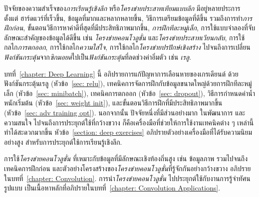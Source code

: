 ปัจจัยของความสำเร็จของ\textit{การเรียนรู้เชิงลึก}
หรือ\textit{โครงข่ายประสาทเทียมแบบลึก}
มีอยู่หลายประการ
ตั้งแต่ ฮาร์ดแวร์ที่เร็วขึ้น,
ข้อมูลที่มากและหลากหลายขึ้น, 
วิธีการเตรียมข้อมูลที่ดีขึ้น รวมถึงการทำ\textit{การฝึกก่อน}\cite{ErhanEtAl2010},
ขั้นตอนวิธีการหาค่าดีที่สุดที่มีประสิทธิภาพมากขึ้น\cite{IoffeSzegedy2015a, KingmaBa2015}, 
\textit{การฝึกทีละหมู่เล็ก}\cite{Bengio2012a},
การใช้แบบจำลองที่จับลักษณะสำคัญของข้อมูลได้ดีขึ้น เช่น \textit{โครงข่ายคอนโวลูชั่น}\cite{LeCunEtAl2015a} และ\textit{โครงข่ายประสาทเวียนกลับ}\cite{HochreiterEtAl2001a, HochreiterSchmidhuber1997, SchusterPaliwal1997},
การใช้กลไก\textit{การตกออก}\cite{srivastavaEtAl2014a},  การใช้กลไก\textit{ความใส่ใจ}\cite{Devlin2019BERTPO, VaswaniEtAl2017},
การใช้กลไก\textit{โครงข่ายปรปักษ์เชิงสร้าง}%
\cite{GoodfellowEtAl2014a, PalssonEtAl2018}
ไปจนถึงการเปลี่ยน\textit{ฟังก์ชันกระตุ้น}จาก\textit{ซิกมอยด์}ไปเป็น\textit{ฟังก์ชันกระตุ้น}ที่ลดช่วงค่าอิ่มตัว เช่น \textit{เรลู}\cite{HintonSalakhutdinov2006a}.

บทที่~\ref{chapter: Deep Learning} นี้ อภิปรายการแก้ปัญหาการเลือนหายของเกรเดียนต์
ด้วยฟังก์ชันกระตุ้นเรลู (หัวข้อ~\ref{sec: relu}),
เทคนิคการจัดการฝึกกับข้อมูลขนาดใหญ่ด้วยการฝึกทีละหมู่เล็ก (หัวข้อ~\ref{sec: minibatch}),
เทคนิคการตกออก
(หัวข้อ~\ref{sec: dropout}),
วิธีการกำหนดค่าน้ำหนักเริ่มต้น
(หัวข้อ~\ref{sec: weight init}),
และขั้นตอนวิธีการฝึกที่มีประสิทธิภาพมากขึ้น
(หัวข้อ~\ref{sec: adv training opt}).
นอกจากนั้น ปัจจัยหนึ่งที่มีส่วนอย่างมาก
ในพัฒนาการ และความสนใจ  ไปจนถึงการประยุกต์ใช้ที่กว้างขวาง
ก็คือเครื่องมือที่ช่วยให้การใช้งานเทคนิคต่าง ๆ เหล่านี้ทำได้สะดวกมากขึ้น
หัวข้อ~\ref{section: deep exercises}
อภิปรายตัวอย่างเครื่องมือที่ได้รับความนิยมอย่างสูง สำหรับการประยุกต์ใช้การเรียนรู้เชิงลึก.

การใช้\textit{โครงข่ายคอนโวลูชั่น} ที่เหมาะกับข้อมูลที่มีลักษณะเชิงท้องถิ่นสูง เช่น ข้อมูลภาพ
รวมไปจนถึงเทคนิคการฝึกก่อน
และตัวอย่างโครงสร้างของ\textit{โครงข่ายคอนโวลูชั่น}ที่รู้จักกันอย่างกว้างขวาง
อภิปรายในบทที่~\ref{chapter: Convolution}. 
การนำ\textit{โครงข่ายคอนโวลูชั่น}
ไปประยุกต์ใช้กับงานการรู้จำทัศนรูปแบบ เป็นเนื้อหาหลักที่อภิปรายในบทที่~\ref{chapter: Convolution Applications}.

